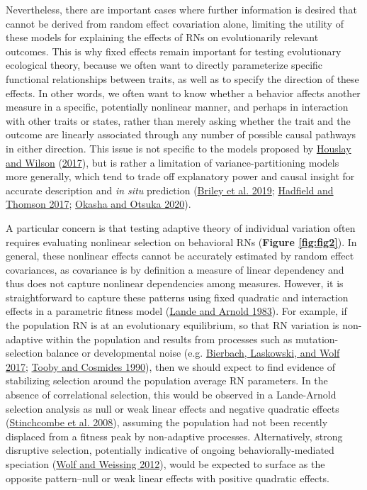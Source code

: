 \documentclass{article}
\begin{document}
Nevertheless, there are important cases where further information is
desired that cannot be derived from random effect covariation alone,
limiting the utility of these models for explaining the effects of RNs
on evolutionarily relevant outcomes. This is why fixed effects remain
important for testing evolutionary ecological theory, because we often
want to directly parameterize specific functional relationships between
traits, as well as to specify the direction of these effects. In other
words, we often want to know whether a behavior affects another measure
in a specific, potentially nonlinear manner, and perhaps in interaction
with other traits or states, rather than merely asking whether the trait
and the outcome are linearly associated through any number of possible
causal pathways in either direction. This issue is not specific to the
models proposed by \protect\hyperlink{ref-Hous2017}{Houslay and Wilson}
(\protect\hyperlink{ref-Hous2017}{2017}), but is rather a limitation of
variance-partitioning models more generally, which tend to trade off
explanatory power and causal insight for accurate description and
\emph{in situ} prediction (\protect\hyperlink{ref-Briley2019}{Briley et
al. 2019}; \protect\hyperlink{ref-Hadfield2017}{Hadfield and Thomson
2017}; \protect\hyperlink{ref-Okasha2020}{Okasha and Otsuka 2020}).

A particular concern is that testing adaptive theory of individual
variation often requires evaluating nonlinear selection on behavioral
RNs (\textbf{Figure \ref{fig:fig2}}). In general, these nonlinear
effects cannot be accurately estimated by random effect covariances, as
covariance is by definition a measure of linear dependency and thus does
not capture nonlinear dependencies among measures. However, it is
straightforward to capture these patterns using fixed quadratic and
interaction effects in a parametric fitness model
(\protect\hyperlink{ref-Lande1983}{Lande and Arnold 1983}). For example,
if the population RN is at an evolutionary equilibrium, so that RN
variation is non-adaptive within the population and results from
processes such as mutation-selection balance or developmental noise
(e.g. \protect\hyperlink{ref-Bierbach2017}{Bierbach, Laskowski, and Wolf
2017}; \protect\hyperlink{ref-Tooby1990}{Tooby and Cosmides 1990}), then
we should expect to find evidence of stabilizing selection around the
population average RN parameters. In the absence of correlational
selection, this would be observed in a Lande-Arnold selection analysis
as null or weak linear effects and negative quadratic effects
(\protect\hyperlink{ref-Stinch2008}{Stinchcombe et al. 2008}), assuming
the population had not been recently displaced from a fitness peak by
non-adaptive processes. Alternatively, strong disruptive selection,
potentially indicative of ongoing behaviorally-mediated speciation
(\protect\hyperlink{ref-Wolf2012}{Wolf and Weissing 2012}), would be
expected to surface as the opposite pattern--null or weak linear effects
with positive quadratic effects.
\end{document}
